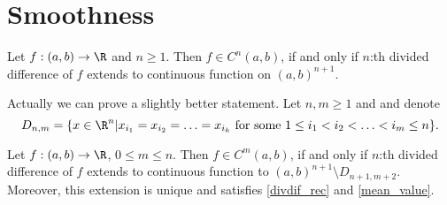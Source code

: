 \section{Smoothness}

\begin{lause}
	Let $f : (a, b) \to \R$ and $n \geq 1$. Then $f \in C^{n}(a, b)$, if and only if $n$:th divided difference of $f$ extends to continuous function on $(a, b)^{n + 1}$.
\end{lause}

Actually we can prove a slightly better statement. Let $n, m \geq 1$ and and denote
\[
	D_{n, m} = \{x \in \R^{n} | x_{i_{1}} = x_{i_{2}} = \ldots = x_{i_{k}} \text{ for some $1 \leq i_{1} < i_{2} < \ldots < i_{m} \leq n$} \}.
\]
\begin{lause}
	Let $f : (a, b) \to \R$, $0 \leq m \leq n$. Then $f \in C^{m}(a, b)$, if and only if $n$:th divided difference of $f$ extends to continuous function to $(a, b)^{n + 1} \setminus D_{n + 1, m + 2}$. Moreover, this extension is unique and satisfies \ref{divdif_rec} and \ref{mean_value}.
\end{lause}

